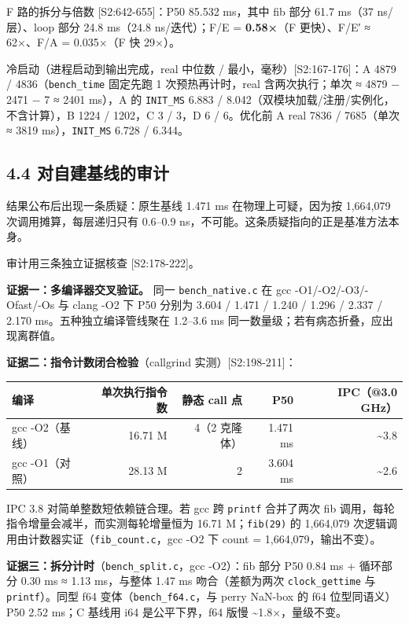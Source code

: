 \documentclass[11pt, a4paper]{article}
\begin{document}
F 路的拆分与倍数 [S2:642-655]：P50 85.532 ms，其中 fib 部分 61.7 ms（37 ns/层）、loop 部分 24.8 ms（24.8 ns/迭代）；F/E = \textbf{0.58×}（F 更快）、F/E′ ≈ 62×、F/A = 0.035×（F 快 29×）。


冷启动（进程启动到输出完成，real 中位数 / 最小，毫秒）[S2:167-176]：A 4879 / 4836（\texttt{bench\_time} 固定先跑 1 次预热再计时，real 含两次执行；单次 ≈ 4879 − 2471 − 7 ≈ 2401 ms），A 的 \texttt{INIT\_MS} 6.883 / 8.042（双模块加载/注册/实例化，不含计算），B 1224 / 1202，C 3 / 3，D 6 / 6。优化前 A real 7836 / 7685（单次 ≈ 3819 ms），\texttt{INIT\_MS} 6.728 / 6.344。


\subsection{4.4 对自建基线的审计}

结果公布后出现一条质疑：原生基线 1.471 ms 在物理上可疑，因为按 1,664,079 次调用摊算，每层递归只有 0.6–0.9 ns，不可能。这条质疑指向的正是基准方法本身。


审计用三条独立证据核查 [S2:178-222]。


\textbf{证据一：多编译器交叉验证。} 同一 \texttt{bench\_native.c} 在 gcc -O1/-O2/-O3/-Ofast/-Os 与 clang -O2 下 P50 分别为 3.604 / 1.471 / 1.240 / 1.296 / 2.337 / 2.170 ms。五种独立编译管线聚在 1.2–3.6 ms 同一数量级；若有病态折叠，应出现离群值。


\textbf{证据二：指令计数闭合检验}（callgrind 实测）[S2:198-211]：


\begin{center}\small\begin{tabular}{lrrrr}
\toprule
编译 & 单次执行指令数 & 静态 call 点 & P50 & IPC（@3.0 GHz） \\
\midrule
gcc -O2（基线） & 16.71 M & 4（2 克隆体） & 1.471 ms & \textasciitilde{}3.8 \\
gcc -O1（对照） & 28.13 M & 2 & 3.604 ms & \textasciitilde{}2.6 \\
\bottomrule
\end{tabular}\end{center}


IPC 3.8 对简单整数短依赖链合理。若 gcc 跨 \texttt{printf} 合并了两次 fib 调用，每轮指令增量会减半，而实测每轮增量恒为 16.71 M；\texttt{fib(29)} 的 1,664,079 次逻辑调用由计数器实证（\texttt{fib\_count.c}，gcc -O2 下 count = 1,664,079，输出不变）。


\textbf{证据三：拆分计时}（\texttt{bench\_split.c}，gcc -O2）：fib 部分 P50 0.84 ms + 循环部分 0.30 ms ≈ 1.13 ms，与整体 1.47 ms 吻合（差额为两次 \texttt{clock\_gettime} 与 \texttt{printf}）。同型 f64 变体（\texttt{bench\_f64.c}，与 perry NaN-box 的 f64 位型同语义）P50 2.52 ms；C 基线用 i64 是公平下界，f64 版慢 \textasciitilde{}1.8×，量级不变。
\end{document}
